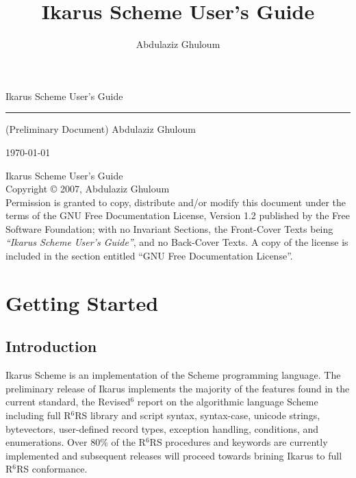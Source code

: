 \documentclass[onecolumn, 12pt, twoside, openright, dvipdfm]{book}
\newcommand{\rnrs}[1]{R$^{\mathrm{#1}}$RS}
\begin{document}
\frontmatter

\VerbatimFootnotes

\title{Ikarus Scheme User's Guide}

\author{Abdulaziz Ghuloum}

\pagestyle{empty}

\mbox{}
\vspace{3in}

{
\fontsize{66}{66}
\begin{center}
Ikarus Scheme User's Guide
\end{center} 
}
\noindent
\rule{\textwidth}{6pt} 
{\fontsize{18}{18}
\hfill{}
(Preliminary Document)
}
\vfill
{
\fontsize{24}{24}
\hfill{} Abdulaziz Ghuloum
}

{
\fontsize{18}{18}
\hfill{} \today
}

\newpage
\mbox{}
\vfill{}
\noindent
Ikarus Scheme User's Guide\\
Copyright \copyright{} 2007,  Abdulaziz Ghuloum\\

\noindent
Permission is granted to copy, distribute and/or modify this
document under the terms of the GNU Free Documentation License,
Version 1.2 published by the Free Software
Foundation; with no Invariant Sections, the Front-Cover Texts
being \emph{``Ikarus Scheme User's Guide''}, and
no Back-Cover Texts.  A copy of the license is included in the
section entitled ``GNU Free Documentation License''.

\newpage

\pagestyle{fancy}
\tableofcontents

\newpage

\mainmatter
\setlength{\parindent}{0pt} 
\setlength{\parskip}{2.0ex plus 0ex minus 0ex}
\chapter{Getting Started}
\section{Introduction}

Ikarus Scheme is an implementation of the Scheme programming
language.  The preliminary release of Ikarus implements the majority
of the features found in the current standard, the
Revised$^\mathrm{6}$ report on the algorithmic language
Scheme\cite{r6rs} including full \rnrs{6} library and script syntax,
syntax-case, unicode strings, bytevectors, user-defined record
types, exception handling, conditions, and enumerations.  Over 80\%
of the \rnrs{6} procedures and keywords are currently implemented
and subsequent releases will proceed towards brining Ikarus to full
\rnrs{6} conformance.
\end{document}
